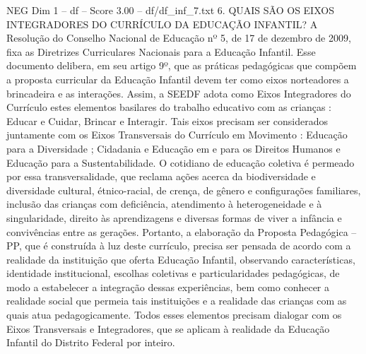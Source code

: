 \begin{textsample}{NEG Dim 1 – df – Score 3.00 – df/df\_inf\_7.txt}  \label{ex:f1_neg_162}
6.
QUAIS SÃO OS EIXOS INTEGRADORES DO CURRÍCULO DA EDUCAÇÃO INFANTIL?
A Resolução do Conselho Nacional de Educação nº 5, de 17 de dezembro de 2009, fixa as Diretrizes Curriculares Nacionais para a Educação Infantil.
Esse documento delibera, em seu artigo 9º, que as práticas pedagógicas que compõem a proposta curricular da Educação Infantil devem ter como eixos norteadores a brincadeira e as interações.
Assim, a SEEDF adota como Eixos Integradores do Currículo estes elementos basilares do trabalho educativo com as crianças : Educar e Cuidar, Brincar e Interagir.
Tais eixos precisam ser considerados juntamente com os Eixos Transversais do Currículo em Movimento : Educação para a Diversidade ; Cidadania e Educação em e para os Direitos Humanos e Educação para a Sustentabilidade.
O cotidiano de educação coletiva é permeado por essa transversalidade, que reclama ações acerca da biodiversidade e diversidade cultural, étnico-racial, de crença, de gênero e configurações familiares, inclusão das crianças com deficiência, atendimento à heterogeneidade e à singularidade, direito às aprendizagens e diversas formas de viver a infância e convivências entre as gerações.
Portanto, a elaboração da Proposta Pedagógica – PP, que é construída à luz deste currículo, precisa ser pensada de acordo com a realidade da instituição que oferta Educação Infantil, observando características, identidade institucional, escolhas coletivas e particularidades pedagógicas, de modo a estabelecer a integração dessas experiências, bem como conhecer a realidade social que permeia tais instituições e a realidade das crianças com as quais atua pedagogicamente.
Todos esses elementos precisam dialogar com os Eixos Transversais e Integradores, que se aplicam à realidade da Educação Infantil do Distrito Federal por inteiro.

\end{textsample}
